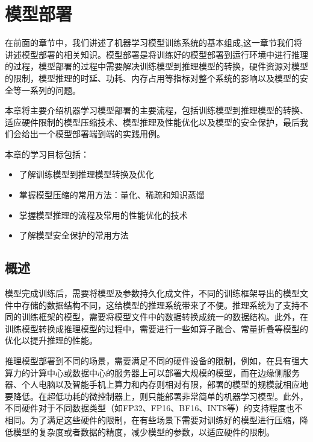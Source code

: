 
\setcounter{chapter}{7}

\chapter{模型部署}
\label{ch:deploy}

在前面的章节中，我们讲述了机器学习模型训练系统的基本组成,这一章节我们将讲述模型部署的相关知识。模型部署是将训练好的模型部署到运行环境中进行推理的过程，模型部署的过程中需要解决训练模型到推理模型的转换，硬件资源对模型的限制，模型推理的时延、功耗、内存占用等指标对整个系统的影响以及模型的安全等一系列的问题。

本章将主要介绍机器学习模型部署的主要流程，包括训练模型到推理模型的转换、适应硬件限制的模型压缩技术、模型推理及性能优化以及模型的安全保护，最后我们会给出一个模型部署端到端的实践用例。

本章的学习目标包括：
\begin{itemize}
    \item 了解训练模型到推理模型转换及优化
    \item 掌握模型压缩的常用方法：量化、稀疏和知识蒸馏
    \item 掌握模型推理的流程及常用的性能优化的技术
    \item 了解模型安全保护的常用方法
\end{itemize}

\section{概述}



模型完成训练后，需要将模型及参数持久化成文件，不同的训练框架导出的模型文件中存储的数据结构不同，这给模型的推理系统带来了不便。推理系统为了支持不同的训练框架的模型，需要将模型文件中的数据转换成统一的数据结构。此外，在训练模型转换成推理模型的过程中，需要进行一些如算子融合、常量折叠等模型的优化以提升推理的性能。

推理模型部署到不同的场景，需要满足不同的硬件设备的限制，例如，在具有强大算力的计算中心或数据中心的服务器上可以部署大规模的模型，而在边缘侧服务器、个人电脑以及智能手机上算力和内存则相对有限，部署的模型的规模就相应地要降低。在超低功耗的微控制器上，则只能部署非常简单的机器学习模型。此外，不同硬件对于不同数据类型（如FP32、FP16、BF16、INT8等）的支持程度也不相同。为了满足这些硬件的限制，在有些场景下需要对训练好的模型进行压缩，降低模型的复杂度或者数据的精度，减少模型的参数，以适应硬件的限制。

